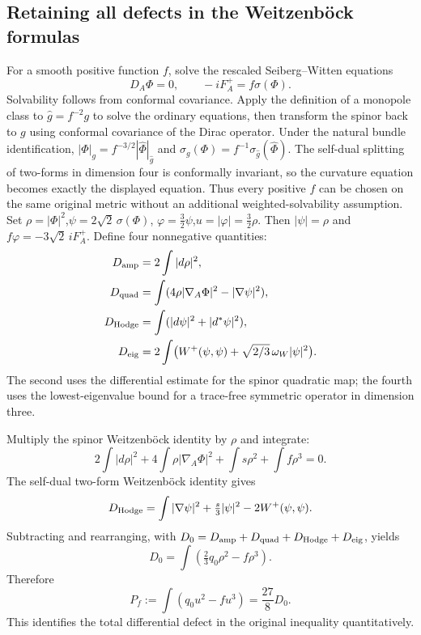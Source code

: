 \documentclass[a4paper,11pt]{article}
\numberwithin{equation}{section}
\theoremstyle{definition}
\begin{document}
\subsection{Retaining all defects in the Weitzenb\"ock formulas}
For a smooth positive function $f$, solve the rescaled Seiberg--Witten equations
\[
D_A\Phi=0,\qquad -iF_A^+=f\sigma(\Phi).
\]
Solvability follows from conformal covariance. Apply the definition of a monopole class to
$\widehat g=f^{-2}g$ to solve the ordinary equations, then transform the spinor back to $g$ using conformal covariance of the Dirac operator.
Under the natural bundle identification, $|\Phi|_g=f^{-3/2}|\widehat\Phi|_{\widehat g}$ and
$\sigma_g(\Phi)=f^{-1}\sigma_{\widehat g}(\widehat\Phi)$.
The self-dual splitting of two-forms in dimension four is conformally invariant, so the curvature equation becomes exactly the displayed equation.
Thus every positive $f$ can be chosen on the same original metric without an additional weighted-solvability assumption\cite[Lemma 3.7 and Proposition 3.8]{LeBrunConvex}.
Set
$\rho=|\Phi|^2$,$\psi=2\sqrt2\,\sigma(\Phi)$,
$\varphi=\tfrac32\psi$,$u=|\varphi|=\tfrac32\rho$.
Then $|\psi|=\rho$ and $f\varphi=-3\sqrt2\,iF_A^+$.
Define four nonnegative quantities:
\begin{align*}
D_{\rm amp}&=2\int|d\rho|^2,\\
D_{\rm quad}&=\int(4\rho|\nabla_A\Phi|^2-|\nabla\psi|^2),\\
D_{\rm Hodge}&=\int(|d\psi|^2+|d^*\psi|^2),\\
D_{\rm eig}&=2\int\bigl(W^+(\psi,\psi)+\sqrt{2/3}\,\omega_W|\psi|^2\bigr).
\end{align*}
The second uses the differential estimate for the spinor quadratic map; the fourth uses the lowest-eigenvalue bound for a trace-free symmetric operator in dimension three.

Multiply the spinor Weitzenb\"ock identity by $\rho$ and integrate:
\[
2\int|d\rho|^2+4\int\rho|\nabla_A\Phi|^2+\int s\rho^2+\int f\rho^3=0.
\]
The self-dual two-form Weitzenb\"ock identity gives
\[
D_{\rm Hodge}=\int|\nabla\psi|^2+\tfrac{s}{3}|\psi|^2-2W^+(\psi,\psi).
\]
Subtracting and rearranging, with $D_0=D_{\rm amp}+D_{\rm quad}+D_{\rm Hodge}+D_{\rm eig}$, yields
\[
D_0=\int\left(\tfrac23q_0\rho^2-f\rho^3\right).
\]
Therefore
\begin{equation}\label{eq:spinor-deficit}
P_f:=\int(q_0u^2-fu^3)=\frac{27}{8}D_0.
\end{equation}
This identifies the total differential defect in the original inequality quantitatively.
\end{document}
